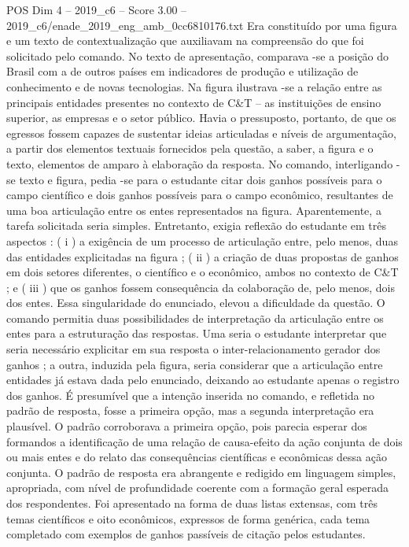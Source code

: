 \begin{textsample}{POS Dim 4 – 2019\_c6 – Score 3.00 – 2019\_c6/enade\_2019\_eng\_amb\_0cc6810176.txt}
Era constituído por uma figura e um texto de contextualização que auxiliavam na compreensão do que foi solicitado pelo comando.
No texto de apresentação, comparava -se a posição do Brasil com a de outros países em indicadores de produção e utilização de conhecimento e de novas tecnologias.
Na figura ilustrava -se a relação entre as principais entidades presentes no contexto de C\&T – as instituições de ensino superior, as empresas e o setor público.
Havia o pressuposto, portanto, de que os egressos fossem capazes de sustentar ideias articuladas e níveis de argumentação, a partir dos elementos textuais fornecidos pela questão, a saber, a figura e o texto, elementos de amparo à elaboração da resposta.
No comando, interligando -se texto e figura, pedia -se para o estudante citar dois ganhos possíveis para o campo científico e dois ganhos possíveis para o campo econômico, resultantes de uma boa articulação entre os entes representados na figura.
Aparentemente, a tarefa solicitada seria simples.
Entretanto, exigia reflexão do estudante em três aspectos : ( i ) a exigência de um processo de articulação entre, pelo menos, duas das entidades explicitadas na figura ; ( ii ) a criação de duas propostas de ganhos em dois setores diferentes, o científico e o econômico, ambos no contexto de C\&T ; e ( iii ) que os ganhos fossem consequência da colaboração de, pelo menos, dois dos entes.
Essa singularidade do enunciado, elevou a dificuldade da questão.
O comando permitia duas possibilidades de interpretação da articulação entre os entes para a estruturação das respostas.
Uma seria o estudante interpretar que seria necessário explicitar em sua resposta o inter-relacionamento gerador dos ganhos ; a outra, induzida pela figura, seria considerar que a articulação entre entidades já estava dada pelo enunciado, deixando ao estudante apenas o registro dos ganhos.
É presumível que a intenção inserida no comando, e refletida no padrão de resposta, fosse a primeira opção, mas a segunda interpretação era plausível.
O padrão corroborava a primeira opção, pois parecia esperar dos formandos a identificação de uma relação de causa-efeito da ação conjunta de dois ou mais entes e do relato das consequências científicas e econômicas dessa ação conjunta.
O padrão de resposta era abrangente e redigido em linguagem simples, apropriada, com nível de profundidade coerente com a formação geral esperada dos respondentes.
Foi apresentado na forma de duas listas extensas, com três temas científicos e oito econômicos, expressos de forma genérica, cada tema completado com exemplos de ganhos passíveis de citação pelos estudantes.

\end{textsample}
